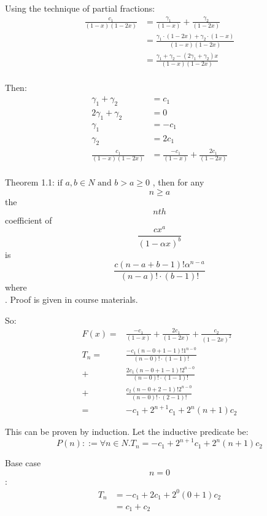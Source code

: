 \documentclass[12pt, letterpaper, twoside]{article}
\begin{document}
Using the technique of partial fractions:
\begin{equation}
    \begin{split}
    \frac{c_1}{(1-x)(1-2x)} & = \frac{\gamma_1}{(1-x)} + \frac{\gamma_2}{(1-2x)} \\
    & = \frac{\gamma_1 \cdot (1-2x) + \gamma_2 \cdot (1-x)}{(1-x)(1-2x)} \\
    & = \frac{\gamma_1 + \gamma_2 - (2 \gamma_1 + \gamma_2) x}{(1-x)(1-2x)} \\
\end{split}
\end{equation}

Then:
\begin{equation} \label{eq5}
    \begin{split}
    \gamma_1 + \gamma_2 & = c_1 \\
    2 \gamma_1 + \gamma_2 & = 0 \\
    \gamma_1 & = -c_1 \\
    \gamma_2 & = 2c_1 \\
    \frac{c_1}{(1-x)(1-2x)} & = \frac{-c_1}{(1-x)} + \frac{2c_1}{(1-2x)} \\
\end{split}
\end{equation}

Theorem 1.1: $ \text{if } a, b \in N \text{ and } b > a \geq 0 $ , then for any \[ n \geq a \] the \[ nth \] coefficient of \[ \frac{c x^a}{(1-\alpha x)^b} \] is
\[ \frac{c (n-a+b-1)! \alpha^{n-a}}{(n-a)! \cdot (b-1)!} \] where
\[  \].  Proof is given in course materials.

So:
\begin{equation} \label{eq6}
    \begin{split}
    F(x) = & \frac{-c_1}{(1-x)} + \frac{2c_1}{(1-2x)} + \frac{c_2}{(1-2x)^2} \\
    T_n = & \frac{-c_1 (n-0+1-1)! 1^{n-0}}{(n-0)! \cdot (1-1)!} \\
    + & \frac{2 c_1 (n-0+1-1)! 2^{n-0}}{(n-0)! \cdot (1-1)!} \\
    + & \frac{c_2 (n-0+2-1)! 2^{n-0}}{(n-0)! \cdot (2-1)!} \\
    = & -c_1 + 2^{n+1} c_1 + 2^n (n+1) c_2
\end{split}
\end{equation}


This can be proven by induction.  Let the inductive predicate be:
\[ P(n) ::= \forall n \in N . T_n = -c_1 + 2^{n+1} c_1 + 2^n (n+1) c_2   \]

Base case \[ n = 0 \]:
\begin{equation} \label{eq7}
    \begin{split}
    T_n & = -c_1 + 2 c_1 + 2^0 (0+1) c_2 \\
    & = c_1 + c_2 \\
\end{split}
\end{equation}
\end{document}
